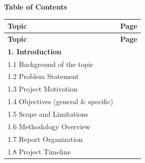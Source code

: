 
\clearpage
\thispagestyle{plain}
{}


\begingroup
\setlength{\parskip}{0pt}
\setlength{\parindent}{0pt}

\vspace*{-1.2cm}

\begin{center}
{\Large \bfseries Table of Contents}
\end{center}

\vspace{0.5cm}

\renewcommand{\arraystretch}{1.2}

\begin{longtable}{|p{13cm}|c|}
\hline
\textbf{Topic} & \textbf{Page} \\ \hline
\endfirsthead

\hline
\textbf{Topic} & \textbf{Page} \\ \hline
\endhead

\textbf{1. Introduction} & \pageref{chapter:intro} \\ \hline
\hspace{0.6cm}1.1 Background of the topic & \pageref{sec:intro:background} \\ \hline
\hspace{0.6cm}1.2 Problem Statement & \pageref{sec:intro:problem} \\ \hline
\hspace{0.6cm}1.3 Project Motivation & \pageref{sec:intro:motivation} \\ \hline
\hspace{0.6cm}1.4 Objectives (general \& specific) & \pageref{sec:intro:objectives} \\ \hline
\hspace{0.6cm}1.5 Scope and Limitations & \pageref{sec:intro:scope} \\ \hline
\hspace{0.6cm}1.6 Methodology Overview & \pageref{sec:intro:method} \\ \hline
\hspace{0.6cm}1.7 Report Organization & \pageref{sec:intro:organization} \\ \hline
\hspace{0.6cm}1.8 Project Timeline & \pageref{sec:intro:timeline} \\ \hline


\end{longtable}

